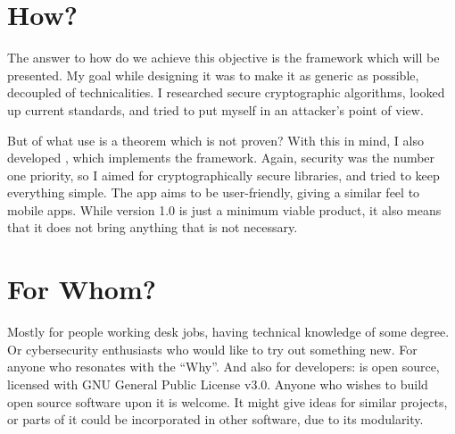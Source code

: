\section{How?}

The answer to how do we achieve this objective is the framework which will be presented.
My goal while designing it was to make it as generic as possible, decoupled of technicalities.
I researched secure cryptographic algorithms, looked up current standards, and tried to put myself in an attacker's point of view.

But of what use is a theorem which is not proven?
With this in mind, I also developed \app{}, which implements the framework.
Again, security was the number one priority, so I aimed for cryptographically secure libraries, and tried to keep everything simple.
The app aims to be user-friendly, giving a similar feel to mobile apps.
While \app{} version 1.0 is just a minimum viable product, it also means that it does not bring anything that is not necessary.

\section{For Whom?}

Mostly for people working desk jobs, having technical knowledge of some degree.
Or cybersecurity enthusiasts who would like to try out something new.
For anyone who resonates with the ``Why''.
And also for developers: \app{} is open source, licensed with GNU General Public License v3.0.
Anyone who wishes to build open source software upon it is welcome.
It might give ideas for similar projects, or parts of it could be incorporated in other software, due to its modularity.
